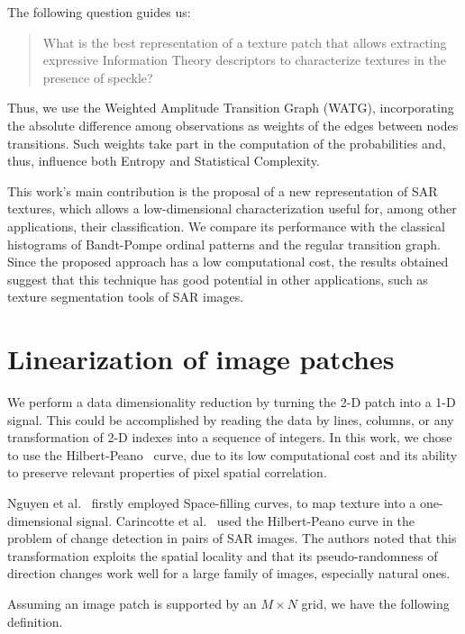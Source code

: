 The following question guides us:
\begin{quote}
What is the best representation of a texture patch that allows extracting expressive Information Theory descriptors to characterize textures in the presence of speckle?
\end{quote}

Thus, we use the Weighted Amplitude Transition Graph (WATG), incorporating the absolute difference among observations as weights of the edges between nodes transitions.
Such weights take part in the computation of the probabilities and, thus, influence both Entropy and Statistical Complexity.

This work's main contribution is the proposal of a new representation of SAR textures, which allows a low-dimensional characterization useful for, among other applications, their classification.
We compare its performance with the classical histograms of Bandt-Pompe ordinal patterns and the regular transition graph.
Since the proposed approach has a low computational cost, the results obtained suggest that this technique has good potential in other applications, such as texture segmentation tools of SAR images.

\section{Linearization of image patches}\label{linearization}

We perform a data dimensionality reduction by turning the \mbox{2-D} patch into a \mbox{1-D} signal.
This could be accomplished by reading the data by lines, columns, or any transformation of \mbox{2-D} indexes into a sequence of integers.
In this work, we chose to use the Hilbert-Peano~\cite{Lee1994Texture} curve, due to its low computational cost and its ability to preserve relevant properties of pixel spatial correlation.

Nguyen et al.~\cite{nguyen1982space} firstly employed Space-filling curves, to map texture into a one-dimensional signal.
Carincotte et al.~\cite{Carincotte2006changeDetection} used the Hilbert-Peano curve in the problem of change detection in pairs of SAR images.
The authors noted that this transformation exploits the spatial locality and that its pseudo-randomness
of direction changes work well for a large family of images, especially
natural ones.

Assuming an image patch is supported by an $M \times N$ grid, we have the following definition.

